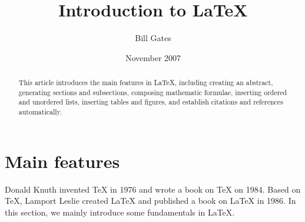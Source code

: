 \documentclass{article}
\title{Introduction to LaTeX}
\author{Bill Gates}
\date {November 2007}
\begin{document}
   \maketitle
\begin{abstract}
This article introduces the main features in LaTeX, including creating an
abstract, generating sections and subsections, composing mathematic
formulae, inserting ordered and unordered lists, inserting tables and
figures, and establish citations and references automatically.
\end{abstract}
\section{Main features}

Donald Knuth invented TeX in 1976 and wrote a book on TeX on 1984. Based on
TeX, Lamport Leslie created LaTeX and published a book on LaTeX in 1986. In
this section, we mainly introduce some fundamentals in LaTeX.
\end{document}

